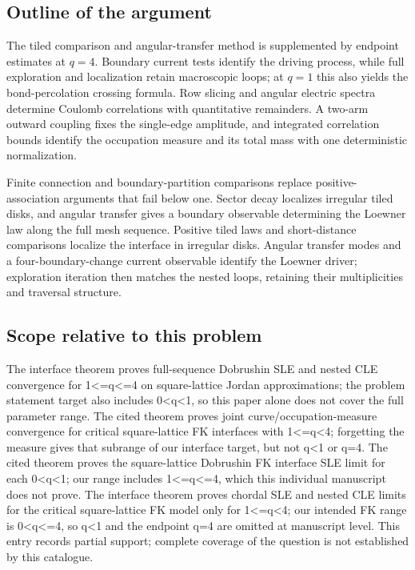 \documentclass[11pt]{article}
\begin{document}
\subsection{Outline of the argument}
The tiled comparison and angular-transfer method is supplemented by endpoint estimates at $q=4$. Boundary current tests identify the driving process, while full exploration and localization retain macroscopic loops; at $q=1$ this also yields the bond-percolation crossing formula. Row slicing and angular electric spectra determine Coulomb correlations with quantitative remainders. A two-arm outward coupling fixes the single-edge amplitude, and integrated correlation bounds identify the occupation measure and its total mass with one deterministic normalization.

Finite connection and boundary-partition comparisons replace positive-association arguments that fail below one. Sector decay localizes irregular tiled disks, and angular transfer gives a boundary observable determining the Loewner law along the full mesh sequence. Positive tiled laws and short-distance comparisons localize the interface in irregular disks. Angular transfer modes and a four-boundary-change current observable identify the Loewner driver; exploration iteration then matches the nested loops, retaining their multiplicities and traversal structure.

\subsection{Scope relative to this problem}
The interface theorem proves full-sequence Dobrushin SLE and nested CLE convergence for 1<=q<=4 on square-lattice Jordan approximations; the problem statement target also includes 0<q<1, so this paper alone does not cover the full parameter range. The cited theorem proves joint curve/occupation-measure convergence for critical square-lattice FK interfaces with 1<=q<4; forgetting the measure gives that subrange of our interface target, but not q<1 or q=4. The cited theorem proves the square-lattice Dobrushin FK interface SLE limit for each 0<q<1; our range includes 1<=q<=4, which this individual manuscript does not prove. The interface theorem proves chordal SLE and nested CLE limits for the critical square-lattice FK model only for 1<=q<4; our intended FK range is 0<q<=4, so q<1 and the endpoint q=4 are omitted at manuscript level. This entry records partial support; complete coverage of the question is not established by this catalogue.
\end{document}
